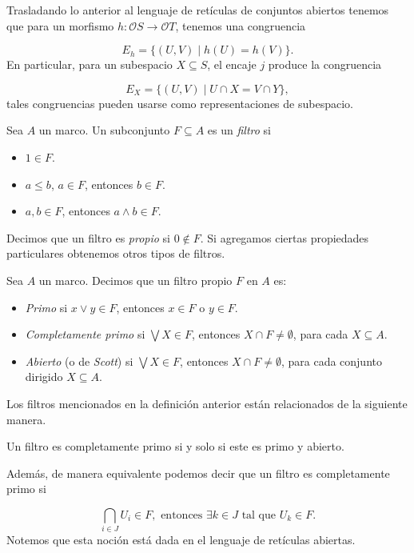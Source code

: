 Trasladando lo anterior al lenguaje de retículas de conjuntos abiertos tenemos que para un morfismo $h\colon \mathcal{O}S\to\mathcal{O}T$, tenemos una congruencia

\[
E_h=\{(U,V)\mid h(U)=h(V)\}.
\]
En particular, para un subespacio $X\subseteq S$, el encaje $j$ produce la congruencia

\[
E_X=\{(U,V)\mid U\cap X=V\cap Y\},
\]
tales congruencias pueden usarse como representaciones de subespacio.\\

\begin{dfn}\label{Filtro}
    Sea $A$ un marco. Un subconjunto $F\subseteq A$ es un \emph{filtro} si
    \begin{itemize}
        \item $1\in F$.
        \item $a\leq b$, $a\in F$, entonces $b\in F$.
        \item $a, b\in F$, entonces $a\wedge b\in F$.
    \end{itemize}
\end{dfn}
Decimos que un filtro es \emph{propio} si $0\notin F$. Si agregamos ciertas propiedades particulares obtenemos otros tipos de filtros.

\begin{dfn}\label{Tfiltros}
    Sea $A$ un marco. Decimos que un filtro propio $F$ en $A$ es:
    \begin{itemize}
        \item \emph{Primo} si $x\vee y\in F$, entonces $x\in F$ o $y\in F$.
        \item \emph{Completamente primo} si $\bigvee X\in F$, entonces $X\cap F\neq \emptyset$, para cada $X\subseteq A$.
        \item \emph{Abierto} (o de \emph{Scott}) si $\bigvee X\in F$, entonces $X\cap F\neq \emptyset$, para cada  conjunto dirigido $X\subseteq A$.
    \end{itemize}
\end{dfn}

Los filtros mencionados en la definición anterior están relacionados de la siguiente manera. 

\begin{prop}
    Un filtro es completamente primo si y solo si este es primo y abierto.
\end{prop}

Además, de manera equivalente podemos decir que un filtro es completamente primo si

\[
\bigcap_{i\in J} U_i\in F, \mbox{ entonces } \exists k\in J \mbox{ tal que }U_k\in F.
\]
Notemos que esta noción está dada en el lenguaje de retículas abiertas.\\

